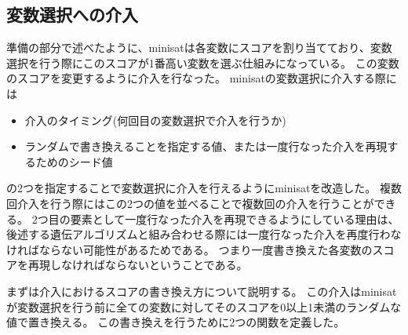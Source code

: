 \subsection{変数選択への介入}






準備の部分で述べたように、minisatは各変数にスコアを割り当てており、変数選択を行う際にこのスコアが1番高い変数を選ぶ仕組みになっている。
この変数のスコアを変更するように介入を行なった。
minisatの変数選択に介入する際には
\begin{itemize}
	\item 介入のタイミング(何回目の変数選択で介入を行うか)
	\item ランダムで書き換えることを指定する値、または一度行なった介入を再現するためのシード値
\end{itemize}
の2つを指定することで変数選択に介入を行えるようにminisatを改造した。
複数回介入を行う際にはこの2つの値を並べることで複数回の介入を行うことができる。
2つ目の要素として一度行なった介入を再現できるようにしている理由は、
後述する遺伝アルゴリズムと組み合わせる際には一度行なった介入を再度行わなければならない可能性があるためである。
つまり一度書き換えた各変数のスコアを再現しなければならないということである。

まずは介入におけるスコアの書き換え方について説明する。
この介入はminisatが変数選択を行う前に全ての変数に対してそのスコアを0以上1未満のランダムな値で置き換える。
この書き換えを行うために2つの関数を定義した。

